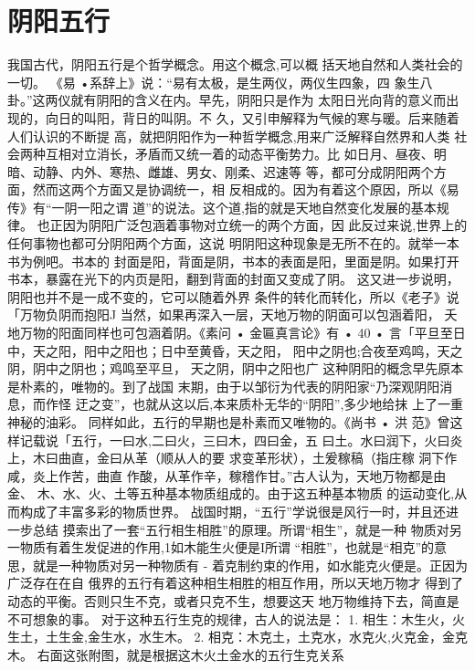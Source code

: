 \section{阴阳五行}
我国古代，阴阳五行是个哲学概念。用这个概念,可以概
括天地自然和人类社会的一切。
《易 •系辞上》说：“易有太极，是生两仪，两仪生四象，四
象生八卦。”这两仪就有阴阳的含义在内。早先，阴阳只是作为
太阳日光向背的意义而出现的，向日的叫阳，背日的叫阴。不
久，又引申解释为气候的寒与暖。后来随着人们认识的不断提
高，就把阴阳作为一种哲学概念,用来广泛解释自然界和人类
社会两种互相对立消长，矛盾而又统一着的动态平衡势力。比
如日月、昼夜、明暗、动静、内外、寒热、雌雄、男女、刚柔、迟速等
等，都可分成阴阳两个方面，然而这两个方面又是协调统一，相
反相成的。因为有着这个原因，所以《易传》有“一阴一阳之谓
道”的说法。这个道,指的就是天地自然变化发展的基本规律。
也正因为阴阳广泛包涵着事物对立统一的两个方面，因
此反过来说,世界上的任何事物也都可分阴阳两个方面，这说
明阴阳这种现象是无所不在的。就举一本书为例吧。书本的
封面是阳，背面是阴，书本的表面是阳，里面是阴。如果打开
书本，暴露在光下的内页是阳，翻到背面的封面又变成了阴。
这又进一步说明，阴阳也并不是一成不变的，它可以随着外界
条件的转化而转化，所以《老子》说「万物负阴而抱阳J
当然，如果再深入一层，天地万物的阴面可以包涵着阳，
夭地万物的阳面同样也可包涵着阴。《素问 • 金匾真言论》有
• 40 •
言「平旦至日中，天之阳，阳中之阳也；日中至黄昏，天之阳，
阳中之阴也;合夜至鸡鸣，天之阴，阴中之阴也；鸡鸣至平旦，
天之阴，阴中之阳也广
这种阴阳的概念早先原本是朴素的，唯物的。到了战国
末期，由于以邹衍为代表的阴阳家“乃深观阴阳消息，而作怪
迂之变”，也就从这以后,本来质朴无华的“阴阳”,多少地给抹
上了一重神秘的油彩。
同样如此，五行的早期也是朴素而又唯物的。《尚书 • 洪
范》曾这样记载说「五行，一曰水,二曰火，三曰木，四曰金，五
曰土。水曰润下，火曰炎上，木曰曲直，金曰从革（顺从人的要
求变革形状），土爰稼稿（指庄稼 洞下作咸，炎上作苦，曲直
作酸，从革作辛，稼稽作甘。”古人认为，天地万物都是由金、
木、水、火、土等五种基本物质组成的。由于这五种基本物质
的运动变化,从而构成了丰富多彩的物质世界。
战国时期，“五行”学说很是风行一时，并且还进一步总结
摸索出了一套“五行相生相胜”的原理。所谓“相生”，就是一种
物质对另一物质有着生发促进的作用,1如木能生火便是I所谓
“相胜”，也就是“相克”的意思，就是一种物质对另一种物质有 - 着克制约束的作用，如水能克火便是。正因为广泛存在在自
俄界的五行有着这种相生相胜的相互作用，所以天地万物才
得到了动态的平衡。否则只生不克，或者只克不生，想要这天
地万物维持下去，简直是不可想象的事。
对于这种五行生克的规律，古人的说法是：
1. 相生：木生火，火生土，土生金,金生水，水生木。
2. 相克：木克土，土克水，水克火,火克金，金克木。
右面这张附图，就是根据这木火土金水的五行生克关系

